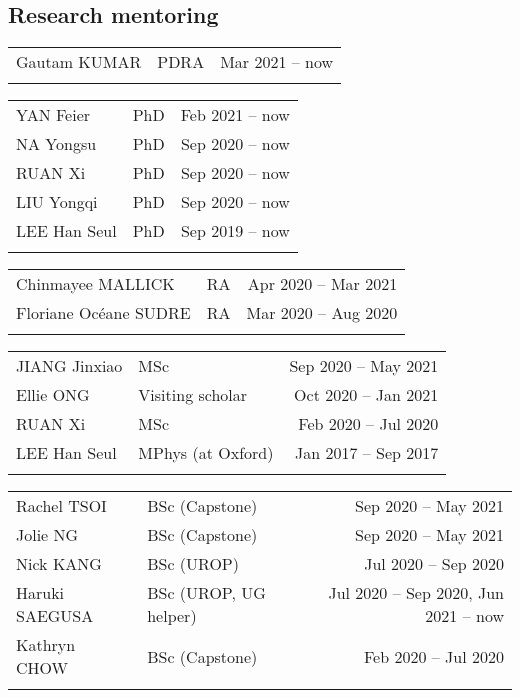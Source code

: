 \documentclass[letterpaper]{article}
\begin{document}
\subsection*{Research mentoring}

\begin{tabular}{llr}
  Gautam KUMAR            & PDRA  & Mar 2021 -- now\\
  \\
\end{tabular}

\begin{tabular}{llr}
  YAN Feier               & PhD   & Feb 2021 -- now\\
  NA Yongsu               & PhD   & Sep 2020 -- now\\
  RUAN Xi                 & PhD   & Sep 2020 -- now\\
  LIU Yongqi              & PhD   & Sep 2020 -- now\\
  LEE Han Seul            & PhD   & Sep 2019 -- now\\
  \\
\end{tabular}

\begin{tabular}{llr}
  Chinmayee MALLICK       & RA    & Apr 2020 -- Mar 2021\\
  Floriane Oc\'eane SUDRE & RA    & Mar 2020 -- Aug 2020\\
  \\
\end{tabular}

\begin{tabular}{llr}
  JIANG Jinxiao           & MSc               & Sep 2020 -- May 2021\\
  Ellie ONG               & Visiting scholar  & Oct 2020 -- Jan 2021\\
  RUAN Xi                 & MSc               & Feb 2020 -- Jul 2020\\
  LEE Han Seul            & MPhys (at Oxford) & Jan 2017 -- Sep 2017\\
  \\
\end{tabular}
  
\begin{tabular}{llr}
  Rachel TSOI             & BSc (Capstone)        & Sep 2020 -- May 2021\\
  Jolie NG                & BSc (Capstone)        & Sep 2020 -- May 2021\\
  Nick KANG               & BSc (UROP)            & Jul 2020 -- Sep 2020\\
  Haruki SAEGUSA          & BSc (UROP, UG helper) & Jul 2020 -- Sep 2020, Jun 2021 -- now\\
  Kathryn CHOW            & BSc (Capstone)        & Feb 2020 -- Jul 2020\\
  \\
\end{tabular}
\end{document}
